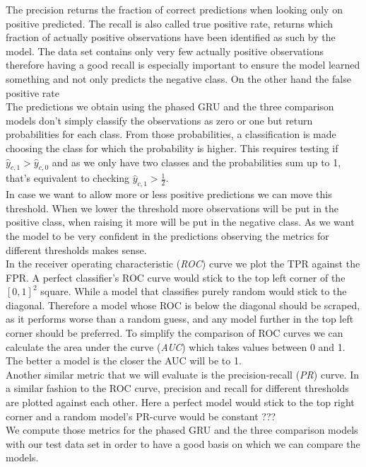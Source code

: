 The precision returns the fraction of correct predictions when looking only on positive predicted. The recall is also called true positive rate, returns which fraction of actually positive observations have been identified as such by the model. The data set contains only very few actually positive observations therefore having a good recall is especially important to ensure the model learned something and not only predicts the negative class.  On the other hand the \color{red} false positive rate \color{black}\\
The predictions we obtain using the phased GRU and the three comparison models don't simply classify the observations as zero or one but return probabilities for each class. From those probabilities, a classification is made choosing the class for which the probability is higher. This requires testing if $\hat{y}_{c,1} > \hat{y}_{c,0}$ and as we only have two classes and the probabilities sum up to 1, that's equivalent to checking  $\hat{y}_{c,1} > \frac{1}{2}$. \\
In case we want to allow more or less positive predictions we can move this threshold. When we lower the threshold more observations will be put in the positive class, when raising it more will be put in the negative class. As we want the model to be very confident in the predictions observing the metrics for different thresholds makes sense. \\
In the receiver operating characteristic (\textit{ROC}) curve we plot the TPR against the FPR. A perfect classifier's ROC curve would stick to the top left corner of the $[0,1]^2$ square. While a model that classifies purely random would stick to the diagonal. Therefore a model whose ROC is below the diagonal should be scraped, as it performs worse than a random guess, and any model further in the top left corner should be preferred. To simplify the comparison of ROC curves we can calculate the area under the curve (\textit{AUC}) which takes values between 0 and 1. The better a model is the closer the AUC will be to 1.\\
Another similar metric that we will evaluate is the precision-recall (\textit{PR}) curve. In a similar fashion to the ROC curve, precision and recall for different thresholds are plotted against each other. Here a perfect model would stick to the top right corner and a random model's PR-curve would be constant \color{red} ??? \color{black} \\
We compute those metrics for the phased GRU and the three comparison models with our test data set in order to have a good basis on which we can compare the models.


